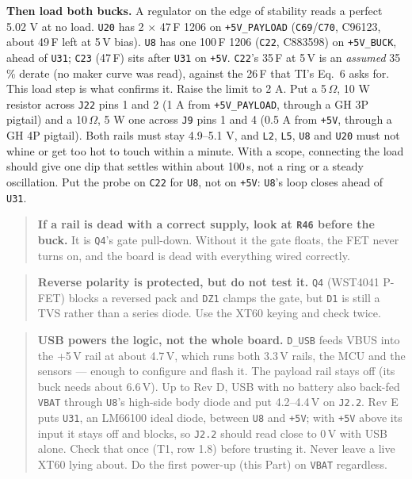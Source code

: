 \documentclass[11pt,a4paper]{article}
\newcommand{\file}[1]{\texttt{\small #1}}
\begin{document}
\textbf{Then load both bucks.} A regulator on the edge of stability reads a perfect 5.02 V
at no load. \file{U20} has 2 $\times$ 47\,\textmu F 1206 on \file{+5V\_PAYLOAD} (\file{C69}/\file{C70},
C96123, about 49\,\textmu F left at 5\,V bias). \file{U8} has one 100\,\textmu F 1206 (\file{C22},
C883598) on \file{+5V\_BUCK}, ahead of \file{U31}; \file{C23} (47\,\textmu F) sits after
\file{U31} on \file{+5V}. \file{C22}'s 35\,\textmu F at 5\,V is an \emph{assumed} 35\,\% derate
(no maker curve was read), against the 26\,\textmu F that TI's Eq.~6 asks for. This load step is
what confirms it. Raise the limit
to 2 A. Put a 5\,$\Omega$, 10 W resistor across \file{J22} pins 1 and 2 (1 A from
\file{+5V\_PAYLOAD}, through a GH 3P pigtail) and a 10\,$\Omega$, 5 W one across \file{J9}
pins 1 and 4 (0.5 A from \file{+5V}, through a GH 4P pigtail). Both rails must stay 4.9--5.1 V, and \file{L2}, \file{L5}, \file{U8} and
\file{U20} must not whine or get too hot to touch within a minute. With a scope, connecting
the load should give one dip that settles within about 100\,\textmu s, not a ring or a
steady oscillation. Put the probe on \file{C22} for \file{U8}, not on \file{+5V}: \file{U8}'s loop closes ahead of \file{U31}.

\begin{quote}
\textbf{If a rail is dead with a correct supply, look at \file{R46} before the buck.} It is
\file{Q4}'s gate pull-down. Without it the gate floats, the FET never turns on, and the
board is dead with everything wired correctly.
\end{quote}

\begin{quote}
\textbf{Reverse polarity is protected, but do not test it.} \file{Q4} (WST4041 P-FET)
blocks a reversed pack and \file{DZ1} clamps the gate, but \file{D1} is still a TVS rather
than a series diode. Use the XT60 keying and check twice.
\end{quote}

\begin{quote}
\textbf{USB powers the logic, not the whole board.} \file{D\_USB} feeds VBUS into the +5\,V
rail at about 4.7\,V, which runs both 3.3\,V rails, the MCU and the sensors --- enough to
configure and flash it. The payload rail stays off (its buck needs about 6.6\,V). Up to Rev D,
USB with no battery also back-fed \file{VBAT} through \file{U8}'s high-side body diode and put
4.2--4.4\,V on \file{J2.2}. Rev E puts \file{U31}, an LM66100 ideal diode, between \file{U8}
and \file{+5V}; with \file{+5V} above its input it stays off and blocks, so \file{J2.2} should
read close to 0\,V with USB alone. Check that once (T1, row 1.8) before trusting it. Never leave
a live XT60 lying about. Do the first power-up (this Part) on \file{VBAT} regardless.
\end{quote}
\end{document}
